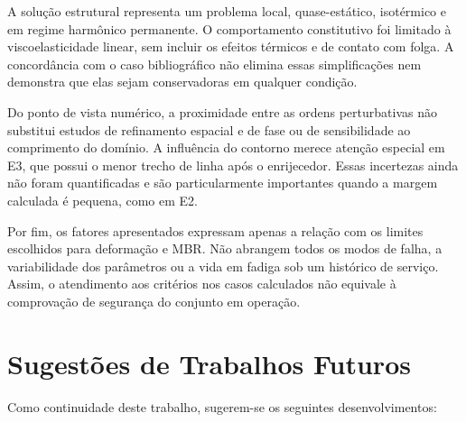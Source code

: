 \documentclass[arial,centeredequations,english,brazilian,oneside,section=TITLE]{ifes8}
\begin{document}
A solução estrutural representa um problema local, quase-estático,
isotérmico e em regime harmônico permanente. O comportamento constitutivo
foi limitado à viscoelasticidade linear, sem incluir os efeitos térmicos
e de contato com folga. A concordância com o caso bibliográfico não
elimina essas simplificações nem demonstra que elas sejam conservadoras
em qualquer condição.

Do ponto de vista numérico, a proximidade entre as ordens perturbativas
não substitui estudos de refinamento espacial e de fase ou de
sensibilidade ao comprimento do domínio. A influência do contorno merece
atenção especial em E3, que possui o menor trecho de linha após o
enrijecedor. Essas incertezas ainda não foram quantificadas e são
particularmente importantes quando a margem calculada é pequena, como
em E2.

Por fim, os fatores apresentados expressam apenas a relação com os
limites escolhidos para deformação e MBR. Não abrangem todos os modos
de falha, a variabilidade dos parâmetros ou a vida em fadiga sob um
histórico de serviço. Assim, o atendimento aos critérios nos casos
calculados não equivale à comprovação de segurança do conjunto em
operação.

\section{Sugestões de Trabalhos Futuros}
\label{sec:trabalhos-futuros}

Como continuidade deste trabalho, sugerem-se os seguintes desenvolvimentos:
\end{document}
